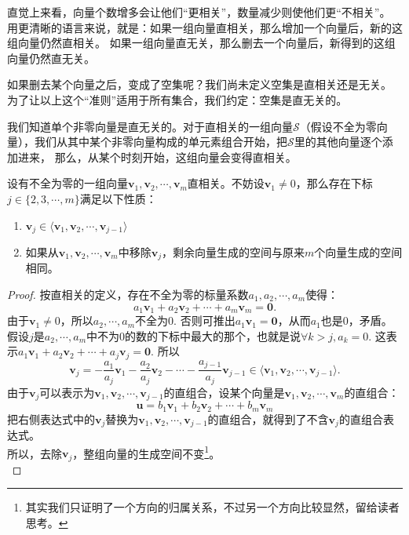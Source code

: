 \documentclass[12pt,UTF8]{ctexbook}
\begin{document}
直觉上来看，向量个数增多会让他们“更相关”，数量减少则使他们更“不相关”。
用更清晰的语言来说，就是：如果一组向量直相关，那么增加一个向量后，新的这组向量仍然直相关。
如果一组向量直无关，那么删去一个向量后，新得到的这组向量仍然直无关。

如果删去某个向量之后，变成了空集呢？我们尚未定义空集是直相关还是无关。
为了让以上这个“准则”适用于所有集合，我们约定：空集是直无关的。

我们知道单个非零向量是直无关的。对于直相关的一组向量$\mathcal{S}$（假设不全为零向量），我们从其中某个非零向量构成的单元素组合开始，把$\mathcal{S}$里的其他向量逐个添加进来，
那么，从某个时刻开始，这组向量会变得直相关。
\begin{pp}\label{pp:2_2}
    设有不全为零的一组向量$\mathbf{v}_1, \mathbf{v}_2 , \cdots , \mathbf{v}_m$直相关。不妨设$\mathbf{v}_1 \neq 0$，那么存在下标$j \in \{2,3, \cdots, m\}$满足以下性质：
    \begin{enumerate}
    \item $\mathbf{v}_j \in \langle \mathbf{v}_1, \mathbf{v}_2 , \cdots , \mathbf{v}_{j-1}\rangle$
    \item 如果从$\mathbf{v}_1, \mathbf{v}_2 , \cdots , \mathbf{v}_m$中移除$\mathbf{v}_j$，剩余向量生成的空间与原来$m$个向量生成的空间相同。
    \end{enumerate}
\end{pp}
\begin{proof} %
    按直相关的定义，存在不全为零的标量系数$a_1, a_2, \cdots, a_m$使得：
    $$ a_1\mathbf{v}_1+a_2\mathbf{v}_2+\cdots+a_m\mathbf{v}_m = \mathbf{0}. $$
    由于$\mathbf{v}_1 \neq 0$，所以$a_2, \cdots, a_m$不全为0. 否则可推出$a_1\mathbf{v}_1 = \mathbf{0}$，从而$a_1$也是0，矛盾。\\
    假设$j$是$a_2, \cdots, a_m$中不为0的数的下标中最大的那个，也就是说$\forall k > j, a_k = 0$. 这表示$ a_1\mathbf{v}_1+a_2\mathbf{v}_2+\cdots+a_j\mathbf{v}_j = \mathbf{0}. $
    所以
    $$ \mathbf{v}_j = -\frac{a_1}{a_j}\mathbf{v}_1-\frac{a_2}{a_j}\mathbf{v}_2-\cdots-\frac{a_{j-1}}{a_j}\mathbf{v}_{j-1} \in \langle \mathbf{v}_1, \mathbf{v}_2 , \cdots , \mathbf{v}_{j-1}\rangle. $$
    由于$ \mathbf{v}_j$可以表示为$\mathbf{v}_1, \mathbf{v}_2 , \cdots , \mathbf{v}_{j-1}$的直组合，设某个向量是$\mathbf{v}_1, \mathbf{v}_2 , \cdots , \mathbf{v}_m$的直组合：
    $$ \mathbf{u} = b_1\mathbf{v}_1+b_2\mathbf{v}_2+\cdots+b_m\mathbf{v}_m$$
    把右侧表达式中的$\mathbf{v}_j$替换为$\mathbf{v}_1, \mathbf{v}_2 , \cdots , \mathbf{v}_{j-1}$的直组合，就得到了不含$\mathbf{v}_j$的直组合表达式。\\
    所以，去除$\mathbf{v}_j$，整组向量的生成空间不变\footnote{其实我们只证明了一个方向的归属关系，不过另一个方向比较显然，留给读者思考。}。\\
\end{proof}
\end{document}
